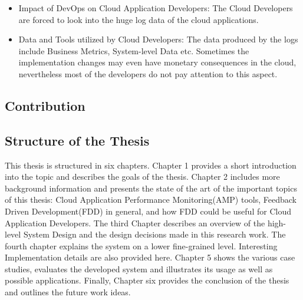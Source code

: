 \documentclass[article,type=msc,colorback,accentcolor=tud7b]{tudthesis}
\begin{document}
\begin{itemize}

	
	\item Impact of DevOps on Cloud Application Developers:	
	The Cloud Developers are forced to look into the huge log data of the cloud applications.
	
	\item Data and Tools utilized by Cloud Developers:
	The data produced by the logs include Business Metrics, System-level Data etc. Sometimes the implementation changes may even have monetary consequences in the cloud, nevertheless most of the developers do not pay attention to this aspect.  
	
	
	
\end{itemize}
 
	
	\subsection{Contribution}
	
	\subsection{Structure of the Thesis}

	\par This thesis is structured in six chapters. Chapter 1 provides a short introduction into the topic and describes the goals of the thesis. Chapter 2 includes more background information and presents the state of the art of the important topics of this thesis: Cloud Application Performance Monitoring(AMP) tools, Feedback Driven Development(FDD) in general, and how FDD could be useful for Cloud Application Developers. The third Chapter describes an overview of the high-level System Design and the design decisions made in this research work. The fourth chapter explains the system on a lower fine-grained level. Interesting Implementation details are also provided here. Chapter 5 shows the various case studies, evaluates the developed system and illustrates its usage as well as possible applications. Finally, Chapter six provides the conclusion of the thesis and outlines the future work ideas.


	\cleardoublepage
\end{document}

